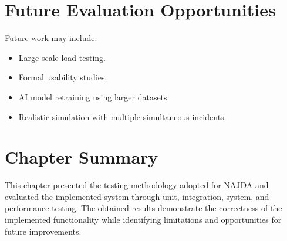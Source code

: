 
\section{Future Evaluation Opportunities}

Future work may include:

\begin{itemize}
    \item Large-scale load testing.
    \item Formal usability studies.
    \item AI model retraining using larger datasets.
    \item Realistic simulation with multiple simultaneous incidents.
\end{itemize}


\section{Chapter Summary}

This chapter presented the testing methodology adopted for NAJDA and evaluated the implemented system through unit, integration, system, and performance testing. The obtained results demonstrate the correctness of the implemented functionality while identifying limitations and opportunities for future improvements.
